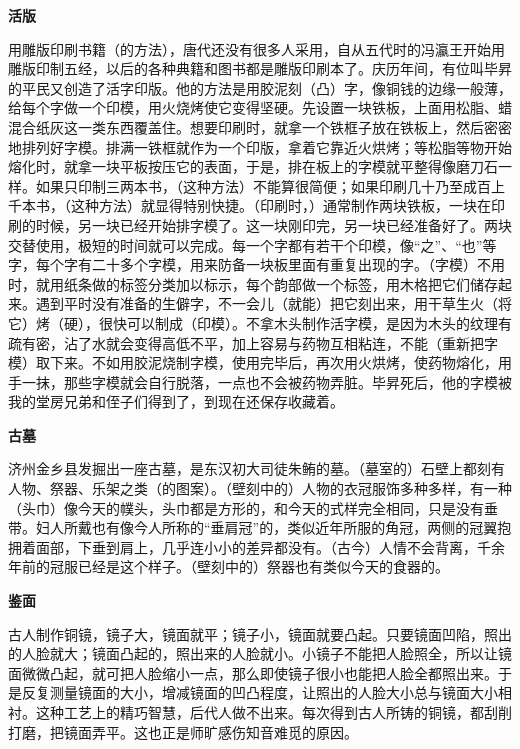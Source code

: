\documentclass[12pt,UTF-8,openany,a4]{ctexbook}
\begin{document}
\begin{large}
    \yiwen 
    \begin{center}{\Large\textbf{活版}}\end{center}
    
    用雕版印刷书籍（的方法），唐代还没有很多人采用，自从五代时的冯瀛王开始用雕版印制五经，以后的各种典籍和图书都是雕版印刷本了。庆历年间，有位叫毕昇的平民又创造了活字印版。他的方法是用胶泥刻（凸）字，像铜钱的边缘一般薄，给每个字做一个印模，用火烧烤使它变得坚硬。先设置一块铁板，上面用松脂、蜡混合纸灰这一类东西覆盖住。想要印刷时，就拿一个铁框子放在铁板上，然后密密地排列好字模。排满一铁框就作为一个印版，拿着它靠近火烘烤；等松脂等物开始熔化时，就拿一块平板按压它的表面，于是，排在板上的字模就平整得像磨刀石一样。如果只印制三两本书，（这种方法）不能算很简便；如果印刷几十乃至成百上千本书，（这种方法）就显得特别快捷。（印刷时，）通常制作两块铁板，一块在印刷的时候，另一块已经开始排字模了。这一块刚印完，另一块已经准备好了。两块交替使用，极短的时间就可以完成。每一个字都有若干个印模，像“之”、“也”等字，每个字有二十多个字模，用来防备一块板里面有重复出现的字。（字模）不用时，就用纸条做的标签分类加以标示，每个韵部做一个标签，用木格把它们储存起来。遇到平时没有准备的生僻字，不一会儿（就能）把它刻出来，用干草生火（将它）烤（硬），很快可以制成（印模）。不拿木头制作活字模，是因为木头的纹理有疏有密，沾了水就会变得高低不平，加上容易与药物互相粘连，不能（重新把字模）取下来。不如用胶泥烧制字模，使用完毕后，再次用火烘烤，使药物熔化，用手一抹，那些字模就会自行脱落，一点也不会被药物弄脏。毕昇死后，他的字模被我的堂房兄弟和侄子们得到了，到现在还保存收藏着。
    
    \begin{center}{\Large\textbf{古墓}}\end{center}
    
    济州金乡县发掘出一座古墓，是东汉初大司徒朱鲔的墓。（墓室的）石壁上都刻有人物、祭器、乐架之类（的图案）。（壁刻中的）人物的衣冠服饰多种多样，有一种（头巾）像今天的幞头，头巾都是方形的，和今天的式样完全相同，只是没有垂带。妇人所戴也有像今人所称的“垂肩冠”的，类似近年所服的角冠，两侧的冠翼抱拥着面部，下垂到肩上，几乎连小小的差异都没有。（古今）人情不会背离，千余年前的冠服已经是这个样子。（壁刻中的）祭器也有类似今天的食器的。
    
    \begin{center}{\Large\textbf{鉴面}}\end{center}
    
    古人制作铜镜，镜子大，镜面就平；镜子小，镜面就要凸起。只要镜面凹陷，照出的人脸就大；镜面凸起的，照出来的人脸就小。小镜子不能把人脸照全，所以让镜面微微凸起，就可把人脸缩小一点，那么即使镜子很小也能把人脸全都照出来。于是反复测量镜面的大小，增减镜面的凹凸程度，让照出的人脸大小总与镜面大小相衬。这种工艺上的精巧智慧，后代人做不出来。每次得到古人所铸的铜镜，都刮削打磨，把镜面弄平。这也正是师旷感伤知音难觅的原因。
    

\end{large}
\end{document}
